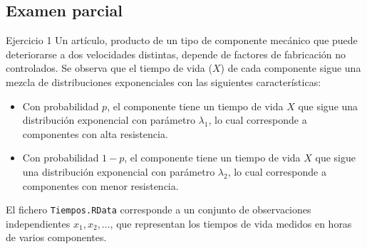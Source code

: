 \subsection{Examen parcial}

Ejercicio 1  
Un artículo, producto de un tipo de componente mecánico que puede deteriorarse a dos velocidades distintas, depende de factores de fabricación no controlados.  
Se observa que el tiempo de vida ($X$) de cada componente sigue una mezcla de distribuciones exponenciales con las siguientes características:

\begin{itemize}
    \item Con probabilidad \(p\), el componente tiene un tiempo de vida \(X\) que sigue una distribución exponencial con parámetro \(\lambda_1\), lo cual corresponde a componentes con alta resistencia.
    \item Con probabilidad \(1-p\), el componente tiene un tiempo de vida \(X\) que sigue una distribución exponencial con parámetro \(\lambda_2\), lo cual corresponde a componentes con menor resistencia.
\end{itemize}

El fichero \texttt{Tiempos.RData} corresponde a un conjunto de observaciones independientes \(x_1, x_2, \dots \), que representan los tiempos de vida medidos en horas de varios componentes.

